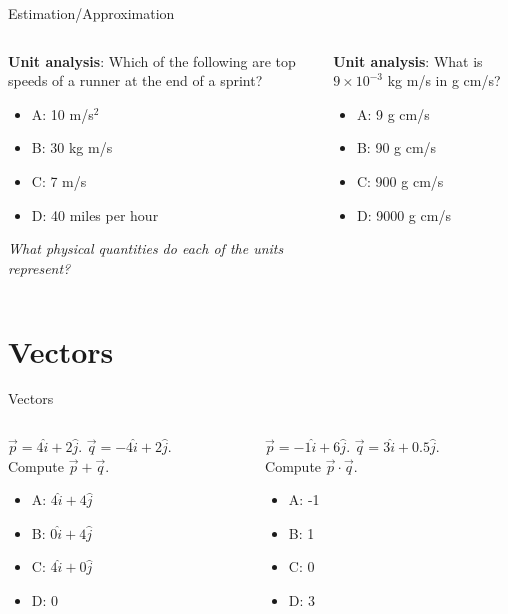 \documentclass{beamer}
\begin{document}
\begin{frame}{Estimation/Approximation}
\small
\begin{columns}[T]
\begin{column}{0.5\textwidth}
\textbf{Unit analysis}: Which of the following are top speeds of a runner at the end of a sprint?
\begin{itemize}
\item A: 10 m/s$^2$
\item B: 30 kg m/s
\item C: 7 m/s
\item D: 40 miles per hour
\end{itemize}
\textit{What physical quantities do each of the units represent?}
\end{column}
\begin{column}{0.5\textwidth}
\textbf{Unit analysis}: What is $9\times 10^{-3}$ kg m/s in g cm/s?
\vspace{0.55cm}
\begin{itemize}
\item A: 9 g cm/s
\item B: 90 g cm/s
\item C: 900 g cm/s
\item D: 9000 g cm/s
\end{itemize}
\end{column}
\end{columns}
\end{frame}

\section{Vectors}

\begin{frame}{Vectors}
\small
\begin{columns}[T]
\begin{column}{0.5\textwidth}
$\vec{p} = 4\hat{i}+2\hat{j}$.  $\vec{q} = -4\hat{i}+2\hat{j}$.  \\
Compute $\vec{p} + \vec{q}$.
\vspace{0.2cm}
\begin{itemize}
\item A: $4\hat{i}+4\hat{j}$
\item B: $0\hat{i}+4\hat{j}$
\item C: $4\hat{i}+0\hat{j}$
\item D: 0
\end{itemize}
\end{column}
\begin{column}{0.5\textwidth}
$\vec{p} = -1\hat{i}+6\hat{j}$.  $\vec{q} = 3\hat{i}+0.5\hat{j}$.  \\
Compute $\vec{p} \cdot \vec{q}$.
\vspace{0.2cm}
\begin{itemize}
\item A: -1
\item B: 1
\item C: 0
\item D: 3
\end{itemize}
\end{column}
\end{columns}
\end{frame}
\end{document}
